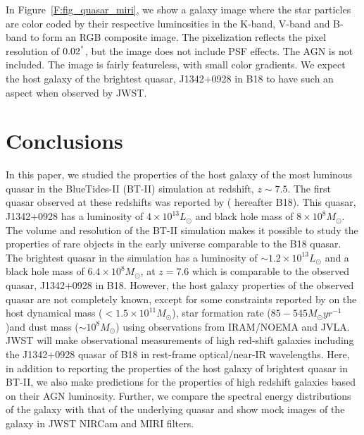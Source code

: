 \documentclass[twocolumn,useAMS,usenatbib]{mnras} \usepackage{natbib}
\begin{document}
In Figure~\ref{F:fig_quasar_miri}, we show a galaxy image where the star particles are color coded by their respective luminosities in the K-band, V-band and B-band to form an RGB composite image. The pixelization reflects the pixel resolution of $0.02^{"}$, but the image does not include PSF effects. The AGN is not included. The image is fairly featureless, with small color gradients. We expect the host galaxy of the brightest quasar, J1342$+$0928 in B18 to have such an aspect when observed by JWST. 
 



\section{Conclusions} \label{S:conclusions} 
In this paper, we studied the properties of the host galaxy of the most luminous quasar in the BlueTides-II (BT-II) simulation at redshift, $z \sim 7.5$. The first quasar observed at these redshifts was reported by \cite{2018Natur.553..473B}( hereafter B18). This quasar, J1342$+$0928 has a luminosity of $4 \times 10^{13} L_{\odot}$ and black hole mass of $8 \times 10^{8}M_{\odot}$. The volume and resolution of the BT-II simulation makes it possible to study the properties of rare objects in the early universe comparable to the B18 quasar. The brightest quasar in the simulation has a luminosity of $\sim 1.2 \times 10^{13} L_{\odot}$ and a black hole mass of $6.4 \times 10^{8}M_{\odot}$, at $z=7.6$ which is comparable to the observed quasar, J1342$+$0928 in B18. However, the host galaxy properties of the observed quasar are not completely known, except for some constraints reported by \cite{2017ApJ...851L...8V} on the host dynamical mass ($< 1.5 \times 10^{11}M_{\odot}$), star formation rate ($85-545 M_{\odot}yr^{-1}$)and dust mass ($\sim 10^{8}M_{\odot}$) using observations from IRAM/NOEMA and JVLA. JWST will make observational measurements of high red-shift galaxies including the J1342$+$0928 quasar of B18 in rest-frame optical/near-IR wavelengths. Here, in addition to reporting the properties of the host galaxy of brightest quasar in BT-II, we also make predictions for the properties of high redshift galaxies based on their AGN luminosity. Further, we compare the spectral energy distributions of the galaxy with that of the underlying quasar and show mock images of the galaxy in JWST NIRCam and MIRI filters.
\end{document}
